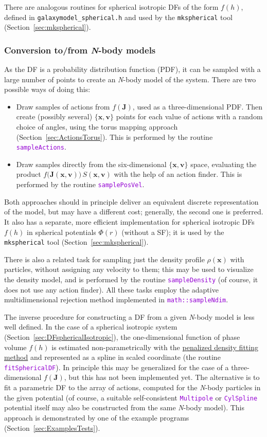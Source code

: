 \documentclass[12pt]{article}
\newcommand{\Nbody}{\textsl{N}-body\xspace}
\newcommand{\ttt}[1]{\textcolor{darkviolet}{\texttt{#1}}}
\newcommand{\bv}{\boldsymbol{v}}
\newcommand{\bx}{\boldsymbol{x}}
\newcommand{\bJ}{\boldsymbol{J}}
\begin{document}
There are analogous routines for spherical isotropic DFs of the form $f(h)$, defined in \texttt{galaxymodel_spherical.h} and used by the \texttt{mkspherical} tool (Section~\ref{sec:mkspherical}).


\subsubsection{Conversion to/from \Nbody models}  \label{sec:Nbody}

As the DF is a probability distribution function (PDF), it can be sampled with a large number of points to create an \Nbody model of the system. There are two possible ways of doing this:
\begin{itemize}  \setlength{\parskip}{2pt} \setlength{\itemsep}{2pt}
\item Draw samples of actions from $f(\bJ)$, used as a three-dimensional PDF. Then create (possibly several) $\{\bx,\bv\}$ points for each value of actions with a random choice of angles, using the torus mapping approach (Section~\ref{sec:ActionsTorus}). This is performed by the routine \ttt{sampleActions}.
\item Draw samples directly from the six-dimensional $\{\bx,\bv\}$ space, evaluating the product $f\big(\bJ(\bx,\bv)\big)\,S(\bx,\bv)$ with the help of an action finder. This is performed by the routine \ttt{samplePosVel}.
\end{itemize}
Both approaches should in principle deliver an equivalent discrete representation of the model, but may have a different cost; generally, the second one is preferred. It also has a separate, more efficient implementation for spherical isotropic DFs $f(h)$ in spherical potentials $\Phi(r)$ (without a SF); it is used by the \texttt{mkspherical} tool (Section~\ref{sec:mkspherical}).

There is also a related task for sampling just the density profile $\rho(\bx)$ with particles, without assigning any velocity to them; this may be used to visualize the density model, and is performed by the routine \ttt{sampleDensity} (of course, it does not use any action finder). All these tasks employ the adaptive multidimensional rejection method implemented in \ttt{math::sampleNdim}.

The inverse procedure for constructing a DF from a given \Nbody model is less well defined. In the case of a spherical isotropic system (Section~\ref{sec:DFsphericalIsotropic}), the one-dimensional function of phase volume $f(h)$ is estimated non-parametrically with the \hyperref[sec:SplineFitting]{penalized density fitting method} and represented as a spline in scaled coordinate (the routine \ttt{fitSphericalDF}). In principle this may be generalized for the case of a three-dimensional $f(\bJ)$, but this has not been implemented yet. The alternative is to fit a parametric DF to the array of actions, computed for the \Nbody particles in the given potential (of course, a suitable self-consistent \ttt{Multipole} or \ttt{CylSpline} potential itself may also be constructed from the same \Nbody model). This approach is demonstrated by one of the example programs (Section~\ref{sec:ExamplesTests}).
\end{document}
